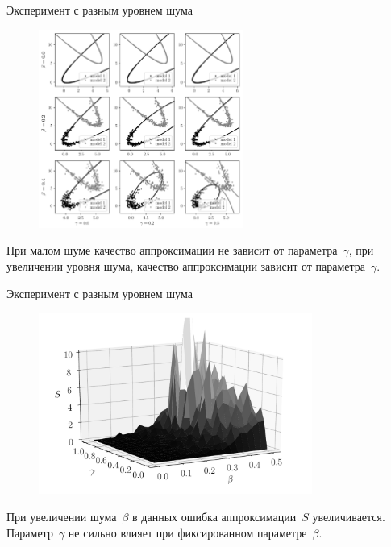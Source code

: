 \documentclass[10pt,pdf,hyperref={unicode}]{beamer}
\begin{document}
\begin{frame}{Эксперимент с разным уровнем шума}
\justifying

\begin{figure}[h!t]\center
\includegraphics[width=0.6\textwidth]{figures/beta_gamma}
\end{figure}

При малом шуме качество аппроксимации не зависит от параметра~$\gamma$, при увеличении уровня шума, качество аппроксимации зависит от параметра~$\gamma$.

\end{frame}

\begin{frame}{Эксперимент с разным уровнем шума}
\justifying

\begin{figure}[h!t]\center
\includegraphics[width=0.8\textwidth]{figures/3dplot}
\end{figure}

При увеличении шума~$\beta$  в данных ошибка аппроксимации~$S$ увеличивается. Параметр~$\gamma$ не сильно влияет при фиксированном параметре~$\beta$.

\end{frame}
\end{document}
